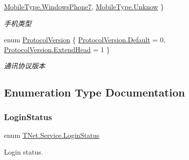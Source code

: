\begin{DoxyCompactItemize}
\mbox{\hyperlink{namespace_t_net_1_1_service_a4153b2b37cffc4fde5d14a462ea83c7badaeddc3506536e2ccbc1aba0df304db7}{Mobile\+Type.\+Windows\+Phone7}}, 
\newline
\mbox{\hyperlink{namespace_t_net_1_1_service_a4153b2b37cffc4fde5d14a462ea83c7ba01ae2e552c349bd5608af0f670f8ebc2}{Mobile\+Type.\+Unknow}}
 \}
\begin{DoxyCompactList}\small\item\em 手机类型 \end{DoxyCompactList}\item 
enum \mbox{\hyperlink{namespace_t_net_1_1_service_a6651119df6dac62b849ed58cf7ece2bd}{Protocol\+Version}} \{ \mbox{\hyperlink{namespace_t_net_1_1_service_a6651119df6dac62b849ed58cf7ece2bda7a1920d61156abc05a60135aefe8bc67}{Protocol\+Version.\+Default}} = 0, 
\mbox{\hyperlink{namespace_t_net_1_1_service_a6651119df6dac62b849ed58cf7ece2bda523e459574b52278a2638a513bac37ef}{Protocol\+Version.\+Extend\+Head}} = 1
 \}
\begin{DoxyCompactList}\small\item\em 通讯协议版本 \end{DoxyCompactList}\end{DoxyCompactItemize}


\subsection{Enumeration Type Documentation}
\mbox{\label{namespace_t_net_1_1_service_a6aea7ec0b2c4f3e53963bbcb309a1dea}} 
\subsubsection{\texorpdfstring{Login\+Status}{LoginStatus}}
{\footnotesize\ttfamily enum \mbox{\hyperlink{namespace_t_net_1_1_service_a6aea7ec0b2c4f3e53963bbcb309a1dea}{T\+Net.\+Service.\+Login\+Status}}\hspace{0.3cm}{\ttfamily [strong]}}



Login status. 

